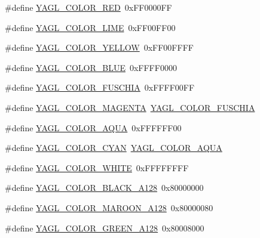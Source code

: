 \begin{DoxyCompactItemize}
\item 
\#define \hyperlink{group____consts__color_gaaa2b77678ea70e7b7aa5791fa771aab2}{Y\-A\-G\-L\-\_\-\-C\-O\-L\-O\-R\-\_\-\-R\-E\-D}~0x\-F\-F0000\-F\-F
\item 
\#define \hyperlink{group____consts__color_gab6584945b074c3a56a132ddef71efc46}{Y\-A\-G\-L\-\_\-\-C\-O\-L\-O\-R\-\_\-\-L\-I\-M\-E}~0x\-F\-F00\-F\-F00
\item 
\#define \hyperlink{group____consts__color_ga9c858ae24ffbd59d61d68cab9a3b0d4b}{Y\-A\-G\-L\-\_\-\-C\-O\-L\-O\-R\-\_\-\-Y\-E\-L\-L\-O\-W}~0x\-F\-F00\-F\-F\-F\-F
\item 
\#define \hyperlink{group____consts__color_ga4c71a101482314acaa693dad5905a8ae}{Y\-A\-G\-L\-\_\-\-C\-O\-L\-O\-R\-\_\-\-B\-L\-U\-E}~0x\-F\-F\-F\-F0000
\item 
\#define \hyperlink{group____consts__color_ga487d96621799626aabf517be0597a1d6}{Y\-A\-G\-L\-\_\-\-C\-O\-L\-O\-R\-\_\-\-F\-U\-S\-C\-H\-I\-A}~0x\-F\-F\-F\-F00\-F\-F
\item 
\#define \hyperlink{group____consts__color_gaaf2b7b086d15afd4e65fbf977c5478b1}{Y\-A\-G\-L\-\_\-\-C\-O\-L\-O\-R\-\_\-\-M\-A\-G\-E\-N\-T\-A}~\hyperlink{group____consts__color_ga487d96621799626aabf517be0597a1d6}{Y\-A\-G\-L\-\_\-\-C\-O\-L\-O\-R\-\_\-\-F\-U\-S\-C\-H\-I\-A}
\item 
\#define \hyperlink{group____consts__color_gae47d275d4e8dcaacb8cf22f36a53cc75}{Y\-A\-G\-L\-\_\-\-C\-O\-L\-O\-R\-\_\-\-A\-Q\-U\-A}~0x\-F\-F\-F\-F\-F\-F00
\item 
\#define \hyperlink{group____consts__color_ga2ef920f99621744db6472f1edfb4ffbe}{Y\-A\-G\-L\-\_\-\-C\-O\-L\-O\-R\-\_\-\-C\-Y\-A\-N}~\hyperlink{group____consts__color_gae47d275d4e8dcaacb8cf22f36a53cc75}{Y\-A\-G\-L\-\_\-\-C\-O\-L\-O\-R\-\_\-\-A\-Q\-U\-A}
\item 
\#define \hyperlink{group____consts__color_ga44202f0e69334c767056bd3b4a355519}{Y\-A\-G\-L\-\_\-\-C\-O\-L\-O\-R\-\_\-\-W\-H\-I\-T\-E}~0x\-F\-F\-F\-F\-F\-F\-F\-F
\item 
\#define \hyperlink{group____consts__color_ga6f9d09e8045f519ad99ac55b8b85c8b5}{Y\-A\-G\-L\-\_\-\-C\-O\-L\-O\-R\-\_\-\-B\-L\-A\-C\-K\-\_\-\-A128}~0x80000000
\item 
\#define \hyperlink{group____consts__color_ga823a0c0e5f5a340711d1a4442109924f}{Y\-A\-G\-L\-\_\-\-C\-O\-L\-O\-R\-\_\-\-M\-A\-R\-O\-O\-N\-\_\-\-A128}~0x80000080
\item 
\#define \hyperlink{group____consts__color_ga03ad24f4420121d917c624fece712796}{Y\-A\-G\-L\-\_\-\-C\-O\-L\-O\-R\-\_\-\-G\-R\-E\-E\-N\-\_\-\-A128}~0x80008000

\end{DoxyCompactItemize}

